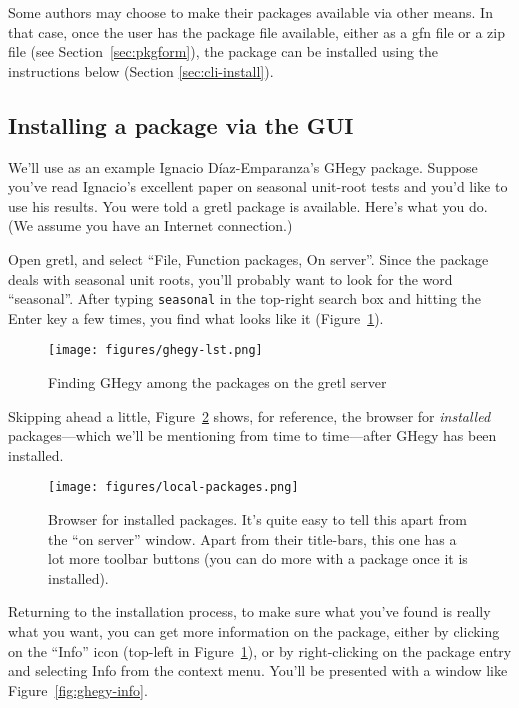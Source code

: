 \documentclass[oneside]{book}
\begin{document}
Some authors may choose to make their packages available via other
means. In that case, once the user has the package file available,
either as a \textsf{gfn} file or a \textsf{zip} file (see
Section~\ref{sec:pkgform}), the package can be installed using
the instructions below (Section \ref{sec:cli-install}).

\subsection{Installing a package via the GUI}
\label{sec:gui-install}

We'll use as an example Ignacio D\'iaz-Emparanza's \textsf{GHegy}
package.  Suppose you've read Ignacio's excellent paper on seasonal
unit-root tests \citep{Ignacio-HEGY} and you'd like to use his
results. You were told a gretl package is available. Here's what you
do. (We assume you have an Internet connection.)

Open gretl, and select ``File, Function packages, On server''. Since
the package deals with seasonal unit roots, you'll probably want to
look for the word ``seasonal''. After typing \texttt{seasonal} in the
top-right search box and hitting the \textsf{Enter} key a few times,
you find what looks like it (Figure~\ref{fig:ghegy-lst}).

\begin{figure}[htbp]
\begin{center}
  \texttt{[image: figures/ghegy-lst.png]}
\end{center}
\caption{Finding GHegy among the packages on the gretl server}
\label{fig:ghegy-lst}
\end{figure}

Skipping ahead a little, Figure~\ref{fig:local-packages} shows, for
reference, the browser for \textit{installed} packages---which we'll
be mentioning from time to time---after \textsf{GHegy} has been
installed.

\begin{figure}[htbp]
\begin{center}
  \texttt{[image: figures/local-packages.png]}
\end{center}
\caption{Browser for installed packages. It's quite easy to tell this
  apart from the ``on server'' window. Apart from their title-bars,
  this one has a lot more toolbar buttons (you can do more with a
  package once it is installed).}
\label{fig:local-packages}
\end{figure}

Returning to the installation process, to make sure what you've found
is really what you want, you can get more information on the package,
either by clicking on the ``Info'' icon (top-left in
Figure~\ref{fig:ghegy-lst}), or by right-clicking on the package entry
and selecting \textsf{Info} from the context menu. You'll be presented
with a window like Figure~\ref{fig:ghegy-info}.
\end{document}
